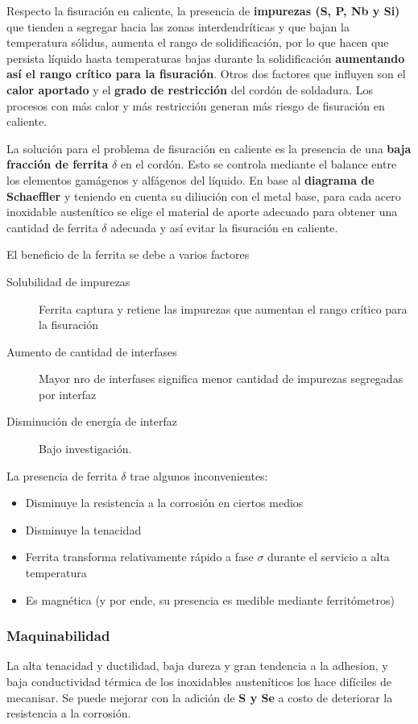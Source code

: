 Respecto la fisuración en caliente, la presencia de \textbf{impurezas (S, P, Nb y Si)} que tienden a segregar hacia las zonas interdendríticas y que bajan la temperatura sólidus, aumenta el rango de solidificación, por lo que hacen que persista líquido hasta temperaturas bajas durante la solidificación \textbf{aumentando así el rango crítico para la fisuración}. Otros dos factores que influyen son el \textbf{calor aportado} y el \textbf{grado de restricción} del cordón de soldadura. Los procesos con más calor y más restricción generan más riesgo de fisuración en caliente.

La solución para el problema de fisuración en caliente es la presencia de una \textbf{baja fracción de ferrita} $\delta$ en el cordón. Esto se controla mediante el balance entre los elementos gamágenos y alfágenos del líquido. En base al \textbf{diagrama de Schaeffler} y teniendo en cuenta su diliución con el metal base, para cada acero inoxidable austenítico se elige el material de aporte adecuado para obtener una cantidad de ferrita $\delta$ adecuada y así evitar la fisuración en caliente.

El beneficio de la ferrita se debe a varios factores

\begin{description}
	\item[Solubilidad de impurezas] Ferrita captura y retiene las impurezas que aumentan el rango crítico para la fisuración
	\item[Aumento de cantidad de interfases] Mayor nro de interfases significa menor cantidad de impurezas segregadas por interfaz
	\item[Disminución de energía de interfaz] Bajo investigación.  
\end{description}

La presencia de ferrita $\delta$ trae algunos inconvenientes:
\begin{itemize}
	\item Disminuye la resistencia a la corrosión en ciertos medios
	\item Disminuye la tenacidad
	\item Ferrita transforma relativamente rápido a fase $\sigma$ durante el servicio a alta temperatura
	\item Es magnética (y por ende, su presencia es medible mediante ferritómetros)
\end{itemize}

\subsubsection{Maquinabilidad}
La alta tenacidad y ductilidad, baja dureza y gran tendencia a la adhesion, y baja conductividad térmica de los inoxidables austeníticos los hace difíciles de mecanisar. Se puede mejorar con la adición de \textbf{S y Se} a costo de  deteriorar la resistencia a la corrosión.

